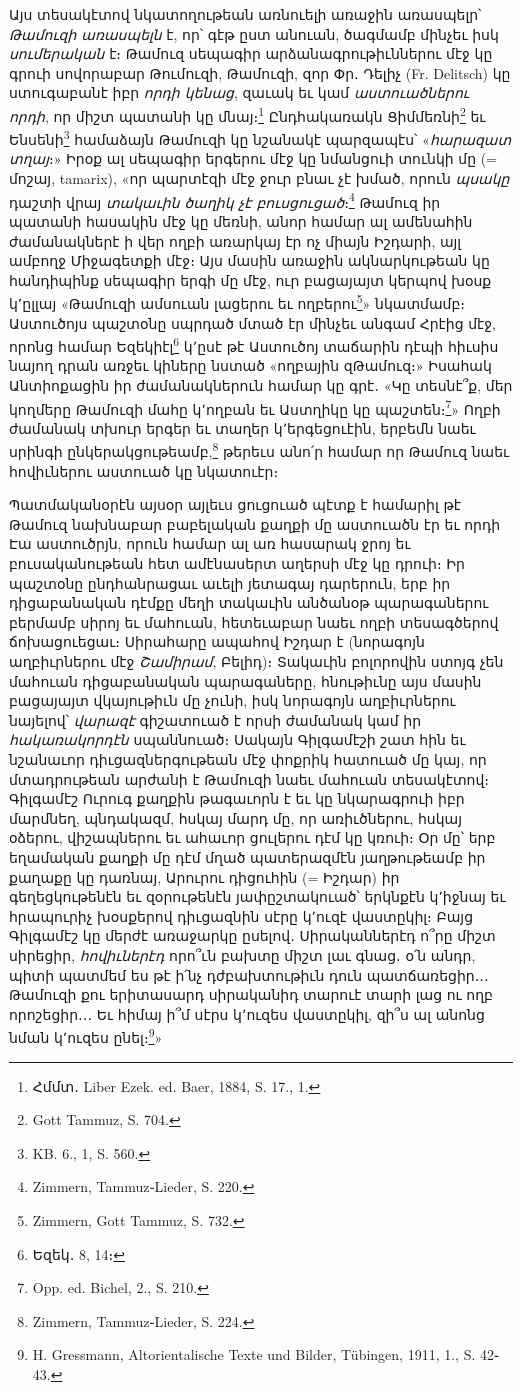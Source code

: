 \documentclass{article}
\begin{document}
{Այս տեսակէտով նկատողութեան առնուելի առաջին առասպելր՝ \emph{Թամուզի առասպելն} է, որ՝ գէթ ըստ անուան, ծագմամբ մինչեւ իսկ \emph{սումերական} է։ Թամուզ սեպագիր արձանագրութիւններու մէջ կը գրուի սովորաբար Թումուզի, Թամուզի, զոր Փր․ Դելիչ (Fr. Delitsch) կը ստուգաբանէ իբր \emph{որդի կենաց}, զաւակ եւ կամ \emph{աստուածներու որդի}, որ միշտ պատանի կը մնայ։\footnote{Հմմտ․ Liber Ezek. ed. Baer, 1884, S. 17., 1.} Ընդհակառակն Ցիմմեռնի\footnote{Gott Tammuz, S. 704.} եւ Ենսենի\footnote{KB. 6., 1, S. 560.} համաձայն Թամուզի կը նշանակէ պարզապէս՝ «\emph{հարազատ տղայ}։» Իրօք ալ սեպագիր երգերու մէջ կը նմանցուի տունկի մը (= մոշայ, tamarix), «որ պարտէզի մէջ ջուր բնաւ չէ խմած, որուն \emph{պսակը} դաշտի վրայ \emph{տակաւին ծաղիկ չէ բուսցուցած}։\footnote{Zimmern, Tammuz֊Lieder, S. 220.} Թամուզ իր պատանի հասակին մէջ կը մեռնի, անոր համար ալ ամենահին ժամանակներէ ի վեր ողբի առարկայ էր ոչ միայն Իշդարի, այլ ամբողջ Միջագետքի մէջ։ Այս մասին առաջին ակնարկութեան կը հանդիպինք սեպագիր երգի մը մէջ, ուր բացայայտ կերպով խօսք կ՚ըլլայ «Թամուզի ամսուան լացերու եւ ողբերու\footnote{Zimmern, Gott Tammuz, S. 732.}» նկատմամբ։ Աստուծոյս պաշտօնը սպրդած մտած էր մինչեւ անգամ Հրէից մէջ, որոնց համար Եզեկիէլ\footnote{Եզեկ․ 8, 14։} կ՚ըսէ թէ Աստուծոյ տաճարին դէպի հիւսիս նայող դրան առջեւ կիները նստած «ողբային զԹամուզ։» Իսահակ Անտիոքացին իր ժամանակներուն համար կը գրէ․ «Կը տեսնէ՞ք, մեր կողմերը Թամուզի մահը կ՚ողբան եւ Աստղիկը կը պաշտեն։\footnote{Opp. ed. Bichel, 2., S. 210.}» Ողբի ժամանակ տխուր երգեր եւ տաղեր կ՚երգեցուէին, երբեմն նաեւ սրինգի ընկերակցութեամբ,\footnote{Zimmern, Tammuz֊Lieder, S. 224.} թերեւս անո՛ր համար որ Թամուզ նաեւ հովիւներու աստուած կը նկատուէր։

Պատմականօրէն այսօր այլեւս ցուցուած պէտք է համարիլ թէ Թամուզ նախնաբար բաբելական քաղքի մը աստուածն էր եւ որդի Էա աստուծրյն, որուն համար ալ առ հասարակ ջրոյ եւ բուսականութեան հետ ամէնասերտ աղերսի մէջ կը դրուի։ Իր պաշտօնը ընդհանրացաւ աւելի յետագայ դարերուն, երբ իր դիցաբանական դէմքը մեղի տակաւին անծանօթ պարագաներու բերմամբ սիրոյ եւ մահուան, հետեւաբար նաեւ ողբի տեսագծերով ճոխացուեցաւ։ Սիրահարը ապահով Իշդար է (նորագոյն աղբիւրներու մէջ \emph{Շամիրամ}, Բելիդ)։ Տակաւին բոլորովին ստոյգ չեն մահուան դիցաբանական պարագաները, հնութիւնը այս մասին բացայայտ վկայութիւն մը չունի, իսկ նորագոյն աղբիւրներու նայելով՝ \emph{վարազէ} գիշատուած է որսի ժամանակ կամ իր \emph{հակառակորդէն} սպաննուած։ Սակայն Գիլգամէշի շատ հին եւ նշանաւոր դիւցազներգութեան մէջ փոքրիկ հատուած մը կայ, որ մտադրութեան արժանի է Թամուզի նաեւ մահուան տեսակէտով։ Գիլգամէշ Ուրուգ քաղքին թագաւորն է եւ կը նկարագրուի իբր մարմնեղ, պնդակազմ, հսկայ մարդ մը, որ առիւծներու, հսկայ օձերու, վիշապներու եւ ահաւոր ցուլերու դէմ կը կռուի։ Օր մը՝ երբ եղամական քաղքի մը դէմ մղած պատերազմէն յաղթութեամբ իր քաղաքը կը դառնայ, Արուրու դիցուհին (= Իշդար) իր գեղեցկութենէն եւ զօրութենէն յափըշտակուած՝ երկնքէն կ՚իջնայ եւ հրապուրիչ խօսքերով դիւցազնին սէրը կ՚ուզէ վաստըկիլ։ Բայց Գիլգամէշ կը մերժէ առաջարկը ըսելով․ Սիրականներէդ ո՞րը միշտ սիրեցիր, \emph{հովիւներէդ} որո՞ւն բախտը միշտ լաւ գնաց․ օ՛ն անդր, պիտի պատմեմ ես թէ ի՛նչ դժբախտութիւն դուն պատճառեցիր․․․ Թամուզի քու երիտասարդ սիրականիդ տարուէ տարի լաց ու ողբ որոշեցիր․․․ Եւ հիմայ ի՞մ սէրս կ՚ուզես վաստըկիլ, զի՞ս ալ անոնց նման կ՚ուզես ընել։\footnote{H. Gressmann, Altorientalische Texte und Bilder, Tübingen, 1911, 1., S. 42֊43.}»

}
\end{document}
